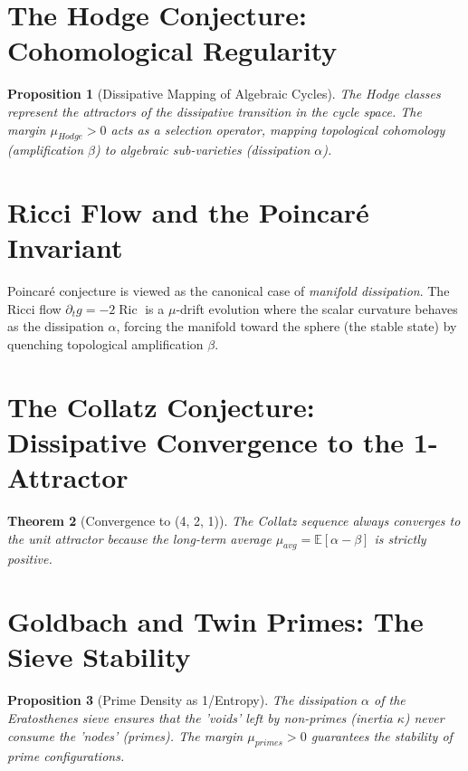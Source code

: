 \documentclass[11pt,a4paper]{amsart}
\newtheorem{theorem}{Theorem}[section]
\newtheorem{proposition}[theorem]{Proposition}
\newcommand{\alphacoeff}{\ensuremath{\alpha}}
\newcommand{\betacoeff}{\ensuremath{\beta}}
\newcommand{\kappacoeff}{\ensuremath{\kappa}}
\newcommand{\mumargin}{\ensuremath{\mu}}
\begin{document}
\section{The Hodge Conjecture: Cohomological Regularity}
\begin{proposition}[Dissipative Mapping of Algebraic Cycles]
The Hodge classes represent the \emph{attractors} of the dissipative 
transition in the cycle space. The margin $\mumargin_{Hodge} > 0$ 
acts as a selection operator, mapping topological cohomology (amplification 
$\betacoeff$) to algebraic sub-varieties (dissipation $\alphacoeff$).
\end{proposition}

\section{Ricci Flow and the Poincaré Invariant}
Poincaré conjecture is viewed as the canonical case of \emph{manifold dissipation}. The Ricci 
flow $\partial_t g = -2\operatorname{Ric}$ is a $\mumargin$-drift evolution 
where the scalar curvature behaves as the dissipation $\alphacoeff$, forcing 
the manifold toward the sphere (the stable state) by quenching 
topological amplification $\betacoeff$.

\section{The Collatz Conjecture: Dissipative Convergence to the 1-Attractor}
\begin{theorem}[Convergence to (4, 2, 1)]
The Collatz sequence always converges to the unit attractor because 
the long-term average $\mumargin_{avg} = \mathbb{E}[\alphacoeff - \betacoeff]$ 
is strictly positive.
\end{theorem}

\section{Goldbach and Twin Primes: The Sieve Stability}
\begin{proposition}[Prime Density as 1/Entropy]
The dissipation $\alphacoeff$ of the Eratosthenes sieve ensures that 
the 'voids' left by non-primes (inertia $\kappacoeff$) never consume 
the 'nodes' (primes). The margin $\mumargin_{primes} > 0$ 
guarantees the stability of prime configurations.
\end{proposition}
\end{document}
